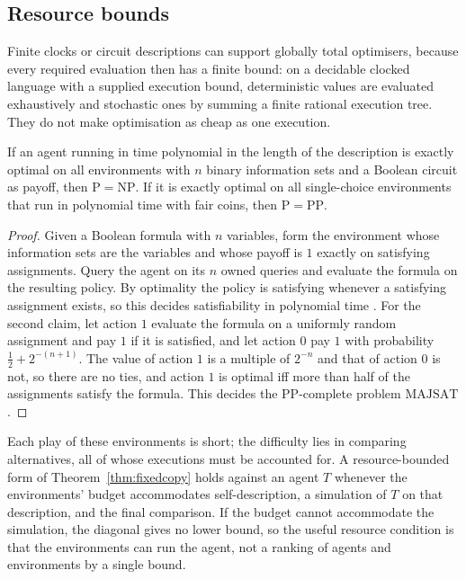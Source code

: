 \subsection{Resource bounds}

Finite clocks or circuit descriptions can support globally total optimisers, because every required
evaluation then has a finite bound: on a decidable clocked language with a supplied execution bound,
deterministic values are evaluated exhaustively and stochastic ones by summing a finite rational
execution tree. They do not make optimisation as cheap as one execution.

\begin{proposition}\label{prop:sat}
If an agent running in time polynomial in the length of the description is exactly optimal on all
environments with $n$ binary information sets and a Boolean circuit as payoff, then
$\mathrm{P}=\mathrm{NP}$. If it is exactly optimal on all single-choice environments that run in
polynomial time with fair coins, then $\mathrm{P}=\mathrm{PP}$.
\end{proposition}

\begin{proof}
Given a Boolean formula with $n$ variables, form the environment whose information sets are the
variables and whose payoff is $1$ exactly on satisfying assignments. Query the agent on its $n$ owned
queries and evaluate the formula on the resulting policy. By optimality the policy is satisfying
whenever a satisfying assignment exists, so this decides satisfiability in polynomial time
\autocite{cook1971}. For the second claim, let action $1$ evaluate the formula on a uniformly random
assignment and pay $1$ if it is satisfied, and let action $0$ pay $1$ with probability
$\tfrac12+2^{-(n+1)}$. The value of action $1$ is a multiple of $2^{-n}$ and that of action $0$ is
not, so there are no ties, and action $1$ is optimal iff more than half of the assignments satisfy the
formula. This decides the $\mathrm{PP}$-complete problem $\mathrm{MAJSAT}$ \autocite{gill1977}.
\end{proof}

Each play of these environments is short; the difficulty lies in comparing alternatives, all of
whose executions must be accounted for. A resource-bounded form of Theorem~\ref{thm:fixedcopy} holds
against an agent $T$ whenever the environments' budget accommodates self-description, a simulation of
$T$ on that description, and the final comparison. If the budget cannot accommodate the simulation,
the diagonal gives no lower bound, so the useful resource condition is that the environments can run
the agent, not a ranking of agents and environments by a single bound.

